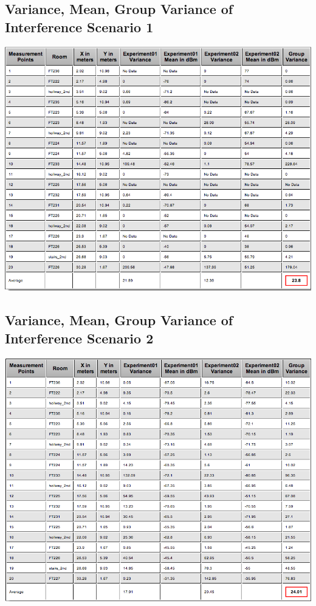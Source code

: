 \documentclass[11pt,a4paper,headinclude,footinclude,chapterprefix=on]{scrreprt}
\begin{document}
\subsection{Variance, Mean, Group Variance of Interference Scenario 1} 
\includegraphics[width=15cm]{../../Source/plot/data/11_int1.png} 
\subsection{Variance, Mean, Group Variance of Interference Scenario 2} 
\includegraphics[width=15cm]{../../Source/plot/data/11_int2.png}
\end{document}
